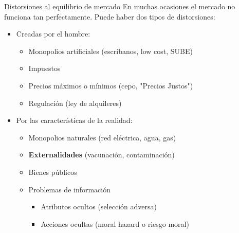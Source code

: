 \documentclass{beamer}
\begin{document}
\begin{frame}{Distorsiones al equilibrio de mercado}
    En muchas ocasiones el mercado no funciona tan perfectamente. Puede haber dos tipos de distorsiones:
    \begin{itemize}
        \item Creadas por el hombre:
        \begin{itemize}
            \item Monopolios artificiales (escribanos, low cost, SUBE)
            \vspace{1mm}
            \item Impuestos
            \vspace{1mm}
            \item Precios máximos o mínimos (cepo, "Precios Justos")
            \vspace{1mm}
            \item Regulación (ley de alquileres)
        \end{itemize}
        \vspace{1mm}
        \item Por las características de la realidad:
        \begin{itemize}
            \item Monopolios naturales (red eléctrica, agua, gas)   
            \vspace{1mm}
            \item \textbf{Externalidades} (vacunación, contaminación)
            \vspace{1mm}
            \item Bienes públicos
            \vspace{1mm}
            \item Problemas de información
            \begin{itemize}
                \item Atributos ocultos (selección adversa)
                \vspace{1mm}
                \item Acciones ocultas (moral hazard o riesgo moral)
            \end{itemize}        
        \end{itemize}
    \end{itemize}
\end{frame}
\end{document}
